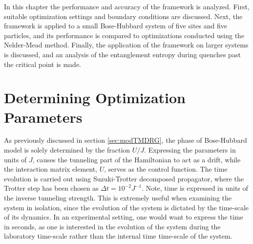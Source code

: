 In this chapter the performance and accuracy of the framework is analyzed. First, suitable optimization settings and boundary conditions are discussed.
Next, the framework is applied to a small Bose-Hubbard system of five sites and five particles, and its performance is compared to optimizations conducted using the Nelder-Mead method.
Finally, the application of the framework on larger systems is discussed, and an analysis of the entanglement entropy during quenches past the critical point is made. 


\section{Determining Optimization Parameters}

As previously discussed in section \ref{sec:modTMDRG}, the phase of Bose-Hubbard model is solely determined by the fraction $U/J$. Expressing the parameters in units of $J$, causes the tunneling part of the Hamiltonian to act as a drift, while the interaction matrix element, $U$, serves as the control function.
The time evolution is carried out using Suzuki-Trotter decomposed propagator, where the Trotter step has been chosen as $\Delta t = 10^{-2} J^{-1}$. Note, time is expressed in units of the inverse tunneling strength. This is extremely useful when examining the system in isolation, since the evolution of the system is dictated by the time-scale of its dynamics. In an experimental setting, one would want to express the time in seconds, as one is interested in the evolution of the system during the laboratory time-scale rather than the internal time time-scale of the system.

